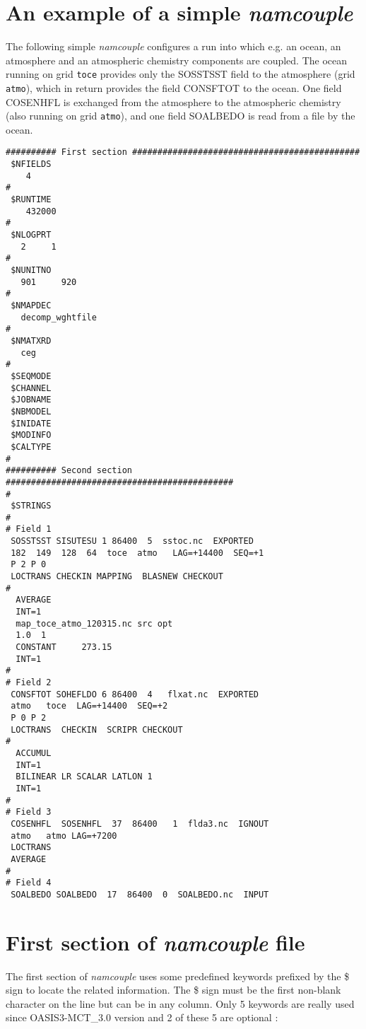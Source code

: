 \section{An example of a simple {\it namcouple}}
\label{subsec_examplenamcouple}

The following simple {\it namcouple} configures a run into which e.g. an
ocean, an atmosphere and an atmospheric chemistry components are
coupled. The ocean running on grid {\tt toce} provides only the SOSSTSST field to the atmosphere (grid {\tt atmo}),
which in return provides the field CONSFTOT to the ocean. One field
COSENHFL is exchanged from the atmosphere to the atmospheric
chemistry (also running on grid {\tt atmo}), and one field SOALBEDO is read from a file by the ocean.

\begin{verbatim}
########## First section #############################################
 $NFIELDS
    4  
#
 $RUNTIME
    432000
#
 $NLOGPRT
   2     1
#
 $NUNITNO
   901     920
#
 $NMAPDEC
   decomp_wghtfile
#
 $NMATXRD
   ceg
#
 $SEQMODE
 $CHANNEL
 $JOBNAME
 $NBMODEL
 $INIDATE
 $MODINFO
 $CALTYPE
#
########## Second section #############################################
#
 $STRINGS
#
# Field 1
 SOSSTSST SISUTESU 1 86400  5  sstoc.nc  EXPORTED
 182  149  128  64  toce  atmo   LAG=+14400  SEQ=+1
 P 2 P 0
 LOCTRANS CHECKIN MAPPING  BLASNEW CHECKOUT 
#
  AVERAGE 
  INT=1
  map_toce_atmo_120315.nc src opt
  1.0  1
  CONSTANT     273.15 
  INT=1
#
# Field 2
 CONSFTOT SOHEFLDO 6 86400  4   flxat.nc  EXPORTED
 atmo   toce  LAG=+14400  SEQ=+2
 P 0 P 2
 LOCTRANS  CHECKIN  SCRIPR CHECKOUT
#
  ACCUMUL 
  INT=1
  BILINEAR LR SCALAR LATLON 1
  INT=1
#
# Field 3
 COSENHFL  SOSENHFL  37  86400   1  flda3.nc  IGNOUT 
 atmo   atmo LAG=+7200 
 LOCTRANS
 AVERAGE
#
# Field 4
 SOALBEDO SOALBEDO  17  86400  0  SOALBEDO.nc  INPUT
\end{verbatim}


\section{ First section of {\it namcouple} file}
\label{subsec_namcouplefirst}

The first section of {\it namcouple } uses some predefined keywords
prefixed by the \$ sign to locate the related information. The \$ sign
must be the first non-blank character on the line but can be in any column.
Only 5 keywords are really used since OASIS3-MCT\_3.0 version and 2 of these 5 are optional :

